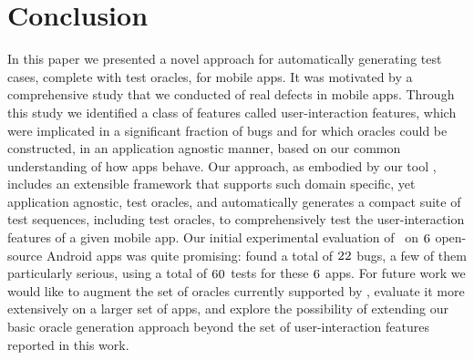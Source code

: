 \section{Conclusion}
\label{conclusion}

In this paper we presented a novel approach for automatically generating test cases, complete with test oracles, for mobile apps. It was motivated by a comprehensive study that we conducted of real defects in mobile apps. Through this study we identified a class of features called user-interaction features, which were implicated in a significant fraction of bugs and for which oracles could be constructed, in an application agnostic manner, based on our common understanding of how apps behave.  Our approach, as embodied by our tool \tool, includes an extensible framework that supports such domain specific, yet application agnostic, test oracles, and automatically generates a compact suite of test sequences,
including test oracles, to comprehensively test the user-interaction features of a given mobile app. Our initial experimental evaluation of \tool\ on $\textsc{6}$ open-source Android apps was quite promising: \tool{} found a total of $\textsc{22}$ bugs, a few of them particularly serious, using a 
total of $\textsc{60}$ tests for these $\textsc{6}$ apps. 
For future work we would like to augment the set of oracles currently supported by \tool, evaluate it more extensively on a larger set of apps, and explore the possibility of extending our basic oracle generation approach beyond the set of user-interaction features reported in this work.


